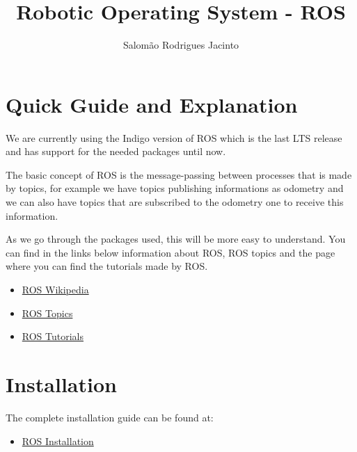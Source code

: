\documentclass{article}
\title{Robotic Operating System - ROS}
\author{Salomão Rodrigues Jacinto}
\begin{document}
\maketitle

\section{Quick Guide and Explanation}
We are currently using the Indigo version of ROS which is the last LTS release
and has support for the needed packages until now.

The basic concept of ROS is the message-passing between processes that is made
by topics, for example we have topics publishing informations as odometry and we
can also have topics that are subscribed to the odometry one to receive this
information.

As we go through the packages used, this will be more easy to understand. You
can find in the links below information about ROS, ROS topics and the page where
you can find the tutorials made by ROS.

\begin{itemize}
\item \href{https://en.wikipedia.org/wiki/Robot_Operating_System}{ROS Wikipedia}
\item \href{http://wiki.ros.org/ROS/Tutorials/UnderstandingTopics}{ROS Topics}
\item \href{http://wiki.ros.org/ROS/Tutorials}{ROS Tutorials}
\end{itemize}


\section{Installation}
The complete installation guide can be found at:

\begin{itemize}
\item \href{http://wiki.ros.org/indigo/Installation/Ubuntu}{ROS Installation}
\end{itemize}
\end{document}
